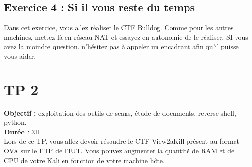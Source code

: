 \subsection{Exercice 4 : Si il vous reste du temps}

Dans cet exercice, vous allez réaliser le CTF Bulldog. Comme pour les autres machines, mettez-là en réseau NAT et essayez en autonomie de le réaliser. SI vous avez la moindre question, n’hésitez pas à appeler un encadrant afin qu’il puisse vous aider.

\newpage

\section{TP 2}

\textbf{Objectif :} exploitation des outils de scans, étude de documents, reverse-shell, python.\\
\textbf{Durée :} 3H\\

Lors de ce TP, vous allez devoir résoudre le CTF View2aKill présent au format OVA sur le FTP de l’IUT. Vous pouvez augmenter la quantité de RAM et de CPU de votre Kali en fonction de votre machine hôte.

